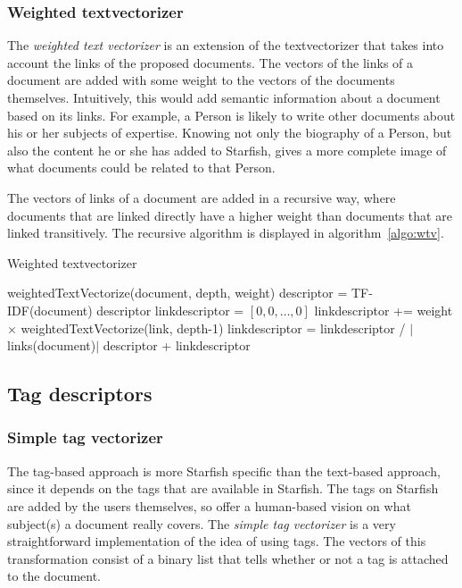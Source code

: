 \subsubsection{Weighted textvectorizer}
The \emph{weighted text vectorizer} is an extension of the textvectorizer that takes
into account the links of the proposed documents. The vectors of the links of a
document are added with some weight to the vectors of the documents themselves.
Intuitively, this would add semantic information about a document based on its
links. For example, a Person is likely to write other documents about his or
her subjects of expertise. Knowing not only the biography of a Person, but also
the content he or she has added to Starfish, gives a more complete image of
what documents could be related to that Person.

The vectors of links of a document are added in a recursive way, where
documents that are linked directly have a higher weight than documents that are
linked transitively. The recursive algorithm is displayed in algorithm~\ref{algo:wtv}.

\begin{algorithm}                      
  \caption{Weighted textvectorizer}      
  \label{algo:wtv}
  \begin{algorithmic}
     weightedTextVectorize(document, depth, weight)
      \STATE descriptor = TF-IDF(document)
        \RETURN descriptor
      \ENDIF
    \STATE linkdescriptor = $[0,0,\ldots,0]$
      \STATE linkdescriptor += weight $\times$ weightedTextVectorize(link, depth-1)
    \ENDFOR
    \STATE linkdescriptor = linkdescriptor / $|$links(document)$|$
    \RETURN descriptor + linkdescriptor
  \end{algorithmic}
\end{algorithm}

\subsection{Tag descriptors}
\subsubsection{Simple tag vectorizer}
The tag-based approach is more Starfish specific than the text-based approach,
since it depends on the tags that are available in Starfish. The tags on
Starfish are added by the users themselves, so offer a human-based vision on
what subject(s) a document really covers. The \emph{simple tag vectorizer} is a very
straightforward implementation of the idea of using tags. The vectors of this
transformation consist of a binary list that tells whether or not a tag is
attached to the document. 

